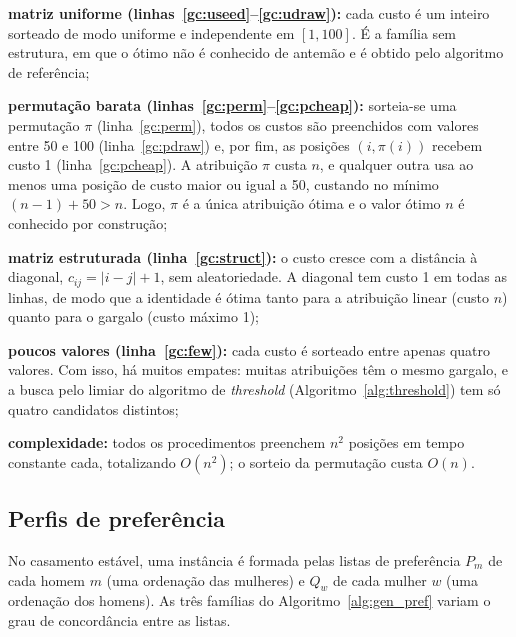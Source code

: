 \begin{alineas}
    \item \textbf{matriz uniforme (linhas~\ref{gc:useed}--\ref{gc:udraw}):} cada custo é um inteiro sorteado de modo uniforme e independente em $[1, 100]$. É a família sem estrutura, em que o ótimo não é conhecido de antemão e é obtido pelo algoritmo de referência;
    \item \textbf{permutação barata (linhas~\ref{gc:perm}--\ref{gc:pcheap}):} sorteia-se uma permutação $\pi$ (linha~\ref{gc:perm}), todos os custos são preenchidos com valores entre 50 e 100 (linha~\ref{gc:pdraw}) e, por fim, as posições $(i, \pi(i))$ recebem custo 1 (linha~\ref{gc:pcheap}). A atribuição $\pi$ custa $n$, e qualquer outra usa ao menos uma posição de custo maior ou igual a 50, custando no mínimo $(n-1) + 50 > n$. Logo, $\pi$ é a única atribuição ótima e o valor ótimo $n$ é conhecido por construção;
    \item \textbf{matriz estruturada (linha~\ref{gc:struct}):} o custo cresce com a distância à diagonal, $c_{ij} = |i - j| + 1$, sem aleatoriedade. A diagonal tem custo 1 em todas as linhas, de modo que a identidade é ótima tanto para a atribuição linear (custo $n$) quanto para o gargalo (custo máximo 1);
    \item \textbf{poucos valores (linha~\ref{gc:few}):} cada custo é sorteado entre apenas quatro valores. Com isso, há muitos empates: muitas atribuições têm o mesmo gargalo, e a busca pelo limiar do algoritmo de \textit{threshold} (Algoritmo~\ref{alg:threshold}) tem só quatro candidatos distintos;
    \item \textbf{complexidade:} todos os procedimentos preenchem $n^2$ posições em tempo constante cada, totalizando $O(n^2)$; o sorteio da permutação custa $O(n)$.
\end{alineas}

\subsection{Perfis de preferência}

No casamento estável, uma instância é formada pelas listas de preferência $P_m$ de cada homem $m$ (uma ordenação das mulheres) e $Q_w$ de cada mulher $w$ (uma ordenação dos homens). As três famílias do Algoritmo~\ref{alg:gen_pref} variam o grau de concordância entre as listas.

